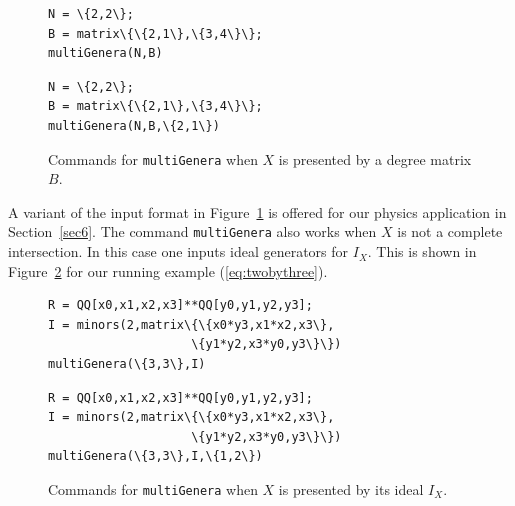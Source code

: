 \documentclass[12pt]{article}
\theoremstyle{definition}
\begin{document}
\begin{figure}[h]
\centering
\begin{minipage}{.48\textwidth}
\begin{tcolorbox}[size=fbox,width=\linewidth,colback=blue!5!white,colframe=blue!75!black]
\begin{Verbatim}[fontsize=\small,commandchars=\\\{\}]
N = \{2,2\};
B = matrix\{\{2,1\},\{3,4\}\};
multiGenera(N,B)
\end{Verbatim}
\end{tcolorbox}
\end{minipage}
\begin{minipage}{.48\textwidth}
\begin{tcolorbox}[size=fbox,width=\linewidth,colback=blue!5!white,colframe=blue!75!black]
\begin{Verbatim}[fontsize=\small,commandchars=\\\{\}]
N = \{2,2\};
B = matrix\{\{2,1\},\{3,4\}\};
multiGenera(N,B,\{2,1\})
\end{Verbatim}
\end{tcolorbox}
\end{minipage}
\caption{Commands for {\tt multiGenera} when $X$ is presented by a degree matrix $B$.}\label{fig:multiGenera1}
\end{figure}

A variant of the input format in Figure~\ref{fig:multiGenera1} is offered for our physics application in 
Section~\ref{sec6}. The command {\tt multiGenera} also works when
 $X$ is not a complete intersection. In this case one
 inputs ideal generators for $I_X$.
 This is shown in Figure~\ref{fig:multiGenera2} for our running example (\ref{eq:twobythree}).

\begin{figure}[h]
\centering
\begin{minipage}{.48\textwidth}
\begin{tcolorbox}[size=fbox,width=\linewidth,colback=blue!5!white,colframe=blue!75!black]
\begin{Verbatim}[fontsize=\small,commandchars=\\\{\}]
R = QQ[x0,x1,x2,x3]**QQ[y0,y1,y2,y3];
I = minors(2,matrix\{\{x0*y3,x1*x2,x3\},
                    \{y1*y2,x3*y0,y3\}\})
multiGenera(\{3,3\},I)
\end{Verbatim}
\end{tcolorbox}
\end{minipage}
\begin{minipage}{.48\textwidth}
\begin{tcolorbox}[size=fbox,width=\linewidth,colback=blue!5!white,colframe=blue!75!black]
\begin{Verbatim}[fontsize=\small,commandchars=\\\{\}]
R = QQ[x0,x1,x2,x3]**QQ[y0,y1,y2,y3];
I = minors(2,matrix\{\{x0*y3,x1*x2,x3\},
                    \{y1*y2,x3*y0,y3\}\})
multiGenera(\{3,3\},I,\{1,2\})
\end{Verbatim}
\end{tcolorbox}
\end{minipage}
\caption{Commands for {\tt multiGenera} when $X$ is presented by its ideal $I_X$.}\label{fig:multiGenera2}
\end{figure}
\end{document}
